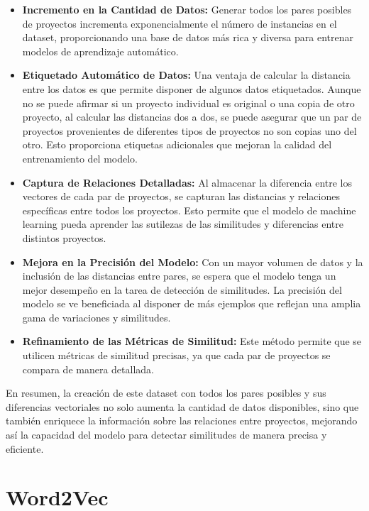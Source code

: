 \begin{itemize}
	\item {\bf Incremento en la Cantidad de Datos:} Generar todos los pares posibles de proyectos incrementa exponencialmente el número de instancias en el dataset, proporcionando una base de datos más rica y diversa para entrenar modelos de aprendizaje automático.
	
	\item {\bf Etiquetado Automático de Datos:} Una ventaja de calcular la distancia entre los datos es que permite disponer de algunos datos etiquetados. Aunque no se puede afirmar si un proyecto individual es original o una copia de otro proyecto, al calcular las distancias dos a dos, se puede asegurar que un par de proyectos provenientes de diferentes tipos de proyectos no son copias uno del otro. Esto proporciona etiquetas adicionales que mejoran la calidad del entrenamiento del modelo.

	\item {\bf Captura de Relaciones Detalladas:} Al almacenar la diferencia entre los vectores de cada par de proyectos, se capturan las distancias y relaciones específicas entre todos los proyectos. Esto permite que el modelo de machine learning pueda aprender las sutilezas de las similitudes y diferencias entre distintos proyectos.
	
	\item {\bf Mejora en la Precisión del Modelo:} Con un mayor volumen de datos y la inclusión de las distancias entre pares, se espera que el modelo tenga un mejor desempeño en la tarea de detección de similitudes. La precisión del modelo se ve beneficiada al disponer de más ejemplos que reflejan una amplia gama de variaciones y similitudes.
	
	\item {\bf Refinamiento de las Métricas de Similitud:} Este método permite que se utilicen métricas de similitud precisas, ya que cada par de proyectos se compara de manera detallada. 

\end{itemize}

En resumen, la creación de este dataset con todos los pares posibles y sus diferencias vectoriales no solo aumenta la cantidad de datos disponibles, sino que también enriquece la información sobre las relaciones entre proyectos, mejorando así la capacidad del modelo para detectar similitudes de manera precisa y eficiente.  


\section{Word2Vec}

